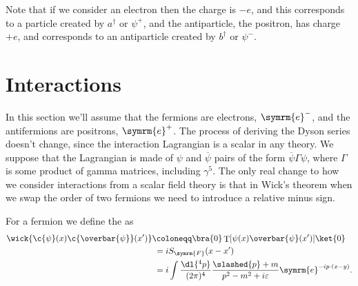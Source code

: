 \documentclass[fleqn]{NotesClass}
\newcommand{\Pe}{\ensuremath{\symrm{e}^{-}}}
\newcommand{\APe}{\ensuremath{\symrm{e}^{+}}}
\newcommand{\e}{\symrm{e}}
\newcommand{\hermit}{{\dagger}}
\DeclareMathOperator{\timeOrdering}{T}
\newcommand{\feynman}{\symrm{F}}
\newcommand{\diracadjoint}[1]{\overbar{#1}}
\begin{document}
    Note that if we consider an electron then the charge is \(-e\), and this corresponds to a particle created by \(a^\hermit\) or \(\psi^+\), and the antiparticle, the positron, has charge \(+e\), and corresponds to an antiparticle created by \(b^\hermit\) or \(\psi^-\).
    
    \section{Interactions}
    In this section we'll assume that the fermions are electrons, \Pe, and the antifermions are positrons, \APe.
    The process of deriving the Dyson series doesn't change, since the interaction Lagrangian is a scalar in any theory.
    We suppose that the Lagrangian is made of \(\psi\) and \(\diracadjoint{\psi}\) pairs of the form \(\diracadjoint{\psi} \Gamma \psi\), where \(\Gamma\) is some product of gamma matrices, including \(\gamma^5\).
    The only real change to how we consider interactions from a scalar field theory is that in Wick's theorem when we swap the order of two fermions we need to introduce a relative minus sign.
    
    For a fermion we define the  as
    \begin{align}\label{eqn:wick contraction for fermions}
        \wick{\c{\psi}(x) \c{\diracadjoint{\psi}}(x')} &\coloneqq \bra{0} \timeOrdering[\psi(x) \diracadjoint{\psi}(x')] \ket{0}\\
        &\hphantom{:}= iS_{\feynman}(x - x')\\
        &\hphantom{:}= i \int \frac{\dl{^4p}}{(2\pi)^4} \frac{\slashed{p} + m}{p^2 - m^2 + i\varepsilon} \e^{-ip\cdot (x - y)}.
    \end{align}
    
\end{document}
